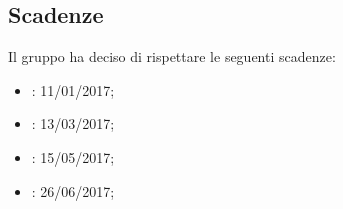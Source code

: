 \subsection{Scadenze}
Il gruppo \gruppo ha deciso di rispettare le seguenti scadenze:
\begin{itemize}
	\item \textbf{\RR}: 11/01/2017;
	\item \textbf{\RP}: 13/03/2017;
	\item \textbf{\RQ}: 15/05/2017;
	\item \textbf{\RA}: 26/06/2017;
\end{itemize}